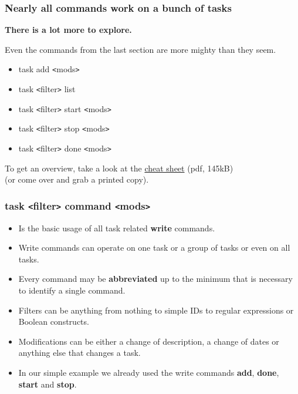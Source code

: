 \documentclass[t,handout]{beamer}
\begin{document}
\begin{frame}[fragile]\frametitle{Nearly all commands work on a bunch of tasks}
    \vfill
    \textbf{There is a lot more to explore.}

    Even the commands from the last section are more mighty than they seem. \pause

    \begin{itemize}
        \item task add {\tt<}mods{\tt>}
        \item task {\tt<}filter{\tt>} list
        \item task {\tt<}filter{\tt>} start {\tt<}mods{\tt>}
        \item task {\tt<}filter{\tt>} stop {\tt<}mods{\tt>}
        \item task {\tt<}filter{\tt>} done {\tt<}mods{\tt>}
    \end{itemize} \pause

    To get an overview, take a look at the \href{http://taskwarrior.org/download/task-2.5.1.ref.pdf}{cheat sheet} (pdf, 145kB) \\
    (or come over and grab a printed copy).
\end{frame}

\begin{frame}[fragile]\frametitle{task {\tt<}filter{\tt>} command {\tt<}mods{\tt>}}
    \vfill
    \begin{itemize}
        \item Is the basic usage of all task related \textbf{write} commands.
        \item Write commands can operate on one task or a group of tasks or even on all tasks.
        \item Every command may be \textbf{abbreviated} up to the minimum that is necessary to identify a single command.
        \item Filters can be anything from nothing to simple IDs to regular expressions or Boolean constructs.
        \item Modifications can be either a change of description, a change of dates or anything else that changes a task.
        \item In our simple example we already used the write commands \textbf{add}, \textbf{done}, \textbf{start} and \textbf{stop}.
    \end{itemize}
\end{frame}
\end{document}

